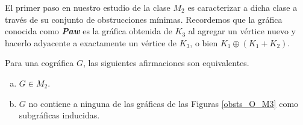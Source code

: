 El primer paso en nuestro estudio de la clase $M_2$ es caracterizar a dicha
clase a través de su conjunto de obstrucciones mínimas.   Recordemos que
la gr\'afica conocida como \textbf{\emph{Paw}} es la gr\'afica obtenida de
$K_3$ al agregar un v\'ertice nuevo y hacerlo adyacente a exactamente un
v\'ertice de $K_3$, o bien $K_1 \oplus (K_1 + K_2)$.

\begin{theorem} \label{teo_obsts_m2}

    Para una cográfica $G$, las siguientes afirmaciones son equivalentes.
    \begin{enumerate}[(a)]
        \item $G \in M_2$.
        \item $G$ no contiene a ninguna de las gráficas de las Figuras \ref{obsts_O_M3} como subgráficas inducidas.
    \end{enumerate}

\end{theorem}

